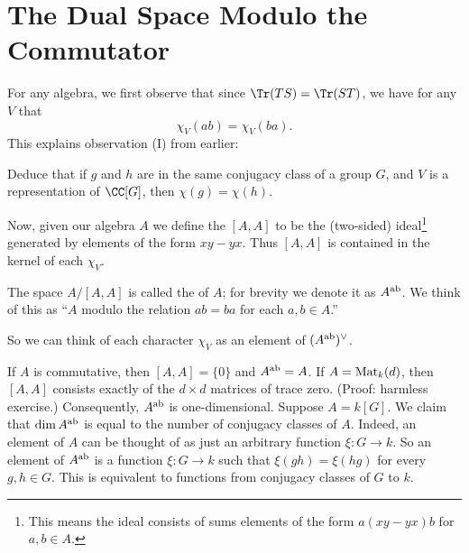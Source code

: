 \section{The Dual Space Modulo the Commutator}
For any algebra, we first observe that since $\Tr(TS) = \Tr(ST)$,
we have for any $V$ that
\[ \chi_V(ab) = \chi_V(ba). \]
This explains observation (I) from earlier:
\begin{ques}
	Deduce that if $g$ and $h$ are in the same conjugacy class of a 
	group $G$, and $V$ is a representation of $\CC[G]$,
	then $\chi(g) = \chi(h)$.
\end{ques}
Now, given our algebra $A$ we define the  $[A,A]$
to be the (two-sided) ideal\footnote{%
	This means the ideal consists of sums elements of the form
	$a(xy-yx)b$ for $a,b \in A$.
}
generated by elements of the form $xy-yx$.
Thus $[A,A]$ is contained in the kernel of each $\chi_V$.
\begin{definition}
	The space $A / [A,A]$ is called the  of $A$;
	for brevity we denote it as $A^\text{ab}$.
	We think of this as ``$A$ modulo the relation $ab=ba$ for each $a,b \in A$.''
\end{definition}
So we can think of each character $\chi_V$ as an element of $(A^\text{ab})^\vee$.

\begin{example}
	\listhack
	\begin{enumerate}[(a)]
		\ii If $A$ is commutative, then $[A,A] = \{0\}$
		and $A^\text{ab} = A$.
		\ii If $A = \mathrm{Mat}_k(d)$, then $[A,A]$ consists exactly
		of the $d \times d$ matrices of trace zero.
		(Proof: harmless exercise.)
		Consequently, $A^\text{ab}$ is one-dimensional.
		\ii Suppose $A = k[G]$.  We claim that $\dim A^\text{ab}$ is equal to the
		number of conjugacy classes of $A$.
		Indeed, an element of $A$ can be thought of as just 
		an arbitrary function $\xi : G \to k$.
		So an element of $A^\text{ab}$ is a function $\xi: G \to k$ such that
		$\xi(gh) = \xi(hg)$ for every $g,h \in G$.
		This is equivalent to functions from conjugacy classes of $G$ to $k$.
	\end{enumerate}
\end{example}

